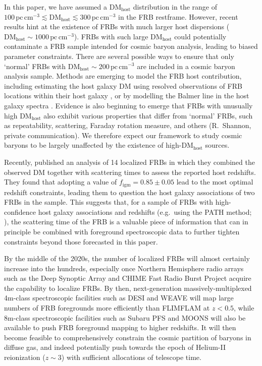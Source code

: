 \documentclass[twocolumn]{aastex63}
\newcommand{\dmhost}{\ensuremath{\mathrm{DM}_\mathrm{host}}}
\newcommand{\pccmcube}{\ensuremath{\mathrm{pc}\,\mathrm{cm}^{-3}}}
\newcommand{\figm}{\ensuremath{f_\mathrm{igm}}}
\begin{document}
\begin{CJK*}{UTF8}{gbsn}
{
In this paper, we have assumed a \dmhost{} distribution in the range of $100\,\pccmcube \lesssim \dmhost \lesssim 300\,\pccmcube$ in the FRB
restframe.
However, recent results \citep{niu:2021} hint at the existence of FRBs with much larger host dispersions ($\dmhost \sim 1000\,\pccmcube$).
FRBs with such large \dmhost{} could potentially contaminate a FRB sample intended for cosmic baryon analysis, leading to biased parameter
constraints. 
There are several possible ways to ensure that only `normal' FRBs with $\dmhost \sim 200\,\pccmcube$ are included in a cosmic
baryon analysis sample. Methods are emerging to model the FRB host contribution, including estimating the host galaxy DM using resolved
observations of FRB locations within their host galaxy \citep[e.g.,][]{chittidi:2020,mannings:2020,marcote:2020}, or by modelling the Balmer
line in the host galaxy spectra \citep[e.g.,][]{tendulkar:2017,bassa:2017,niu:2021}.
Evidence is also beginning to emerge that FRBs with unusually high \dmhost{} also exhibit various properties
that differ from `normal' FRBs, such as repeatability, scattering, Faraday rotation measure, and others (R.\ Shannon, private communication).
We therefore expect our framework to study cosmic baryons to be largely
unaffected by the existence of 
high-\dmhost{} sources.
}

Recently, \citet{cordes:2021} published an analysis of 14 localized FRBs in which they combined the observed DM together with scattering times to assess 
the reported host redshifts. They found that adopting a value of $\figm = 0.85 \pm 0.05 $ lead to the most optimal redshift constraints, 
leading them to question the host galaxy associations of two FRBs in the sample. This suggests that, for a sample of FRBs with high-confidence
host galaxy associations and redshifts (e.g.\ using the PATH method; \citealt{aggarwal:2021}), the scattering time of the FRB is a valuable piece 
of information that can in principle be combined with foreground spectroscopic data to further tighten constraints beyond those forecasted in this paper.

By the middle of the 2020s, the number of localized FRBs will almost certainly increase into the hundreds, {especially once 
Northern Hemisphere radio arrays such as the Deep Synoptic Array \citep[DSA;][]{kocz:2019} and CHIME Fast Radio Burst Project
\citep{chime/frb-collaboration:2018} acquire the capability to localize FRBs.
By then, next-generation massively-multiplexed 4m-class spectroscopic facilities such as DESI \citep{levi:2013} and
WEAVE \citep{dalton:2012} will map large numbers of FRB foregrounds more efficiently than FLIMFLAM at $z<0.5$, while
8m-class spectroscopic facilities such as Subaru PFS \citep{sugai:2015} and MOONS \citep{cirasuolo:2014} will also be available to push 
FRB foreground mapping to higher redshifts. }
It will then become feasible to comprehensively
constrain the cosmic partition of baryons in diffuse gas, and indeed potentially push towards the epoch of Helium-II reionization ($z\sim 3$) with sufficient allocations
of telescope time.


\end{CJK*}
\end{document}
